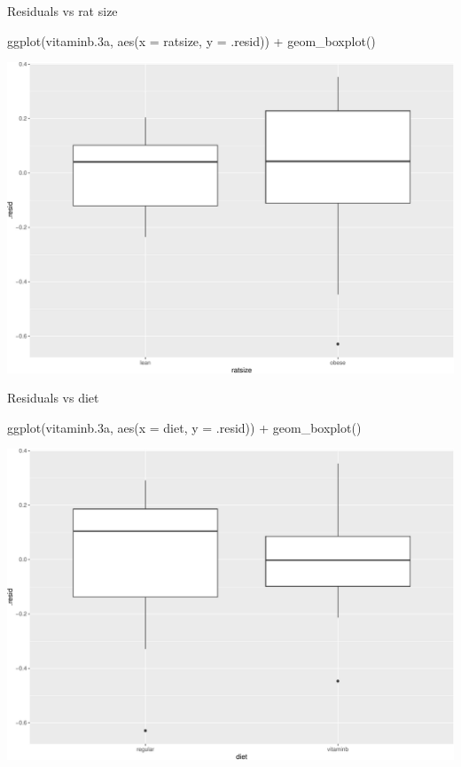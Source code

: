 \documentclass[
  ignorenonframetext,
]{beamer}
\newenvironment{Shaded}{\begin{snugshade}}{\end{snugshade}}
\newcommand{\AttributeTok}[1]{\textcolor[rgb]{0.40,0.45,0.13}{#1}}
\newcommand{\FloatTok}[1]{\textcolor[rgb]{0.68,0.00,0.00}{#1}}
\newcommand{\FunctionTok}[1]{\textcolor[rgb]{0.28,0.35,0.67}{#1}}
\newcommand{\NormalTok}[1]{\textcolor[rgb]{0.00,0.23,0.31}{#1}}
\newcommand{\SpecialCharTok}[1]{\textcolor[rgb]{0.37,0.37,0.37}{#1}}
\begin{document}
\begin{frame}[fragile]{Residuals vs rat size}
\protect\hypertarget{residuals-vs-rat-size}{}
\begin{Shaded}
\begin{Highlighting}[]
\FunctionTok{ggplot}\NormalTok{(vitaminb}\FloatTok{.3}\NormalTok{a, }\FunctionTok{aes}\NormalTok{(}\AttributeTok{x =}\NormalTok{ ratsize, }\AttributeTok{y =}\NormalTok{ .resid)) }\SpecialCharTok{+} 
  \FunctionTok{geom\_boxplot}\NormalTok{()}
\end{Highlighting}
\end{Shaded}

\includegraphics{anova_files/figure-beamer/bAnova-21-1.pdf}
\end{frame}

\begin{frame}[fragile]{Residuals vs diet}
\protect\hypertarget{residuals-vs-diet}{}
\begin{Shaded}
\begin{Highlighting}[]
\FunctionTok{ggplot}\NormalTok{(vitaminb}\FloatTok{.3}\NormalTok{a, }\FunctionTok{aes}\NormalTok{(}\AttributeTok{x =}\NormalTok{ diet, }\AttributeTok{y =}\NormalTok{ .resid)) }\SpecialCharTok{+} 
  \FunctionTok{geom\_boxplot}\NormalTok{()}
\end{Highlighting}
\end{Shaded}

\includegraphics{anova_files/figure-beamer/bAnova-22-1.pdf}
\end{frame}
\end{document}
